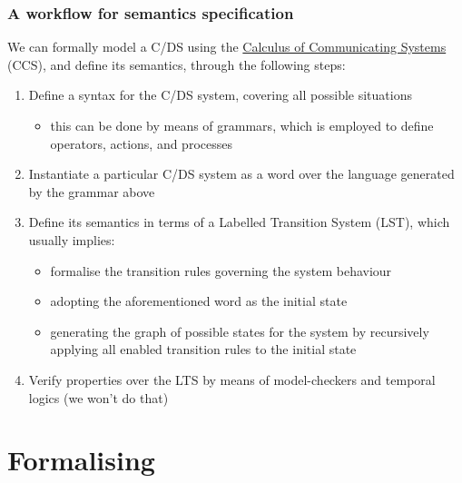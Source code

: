 \documentclass[presentation]{beamer}\mode<presentation>{\usetheme{AMSCesenaPurpleAndGold}}
\begin{document}
\begin{frame}
\frametitle{A workflow for semantics specification}
    
    We can \alert{formally} model a C/DS using the \href{https://en.wikipedia.org/wiki/Calculus_of_communicating_systems}{\alert{Calculus of Communicating Systems}} (CCS), and define its semantics, through the following steps:
    \begin{enumerate}
        \item Define a \alert{syntax} for the C/DS system, covering all possible situations
        \begin{itemize}
            \item this can be done by means of \alert{grammars}, which is employed to define operators, actions, and processes
        \end{itemize}
        
        \item Instantiate a particular C/DS system as a \alert{word} over the language generated by the grammar above
        
        \item Define its semantics in terms of a \alert{Labelled Transition System} (LST), which usually implies:
        \begin{itemize}
            \item formalise the \alert{transition rules} governing the system behaviour
            \item adopting the aforementioned word as the \alert{initial state}
            
            \item generating the graph of possible states for the system by recursively applying all enabled transition rules to the initial state
        \end{itemize}
        
        \item Verify properties over the LTS by means of \alert{model-checkers} and \alert{temporal logics} (we won't do that) 
    \end{enumerate}
    
\end{frame}


\section{Formalising \linda{}}
\end{document}
